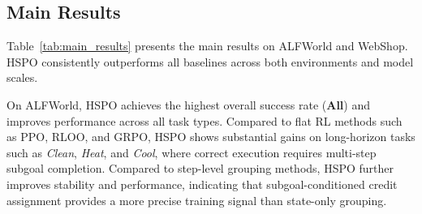 \documentclass{article}
\begin{document}
\begin{table}[t]
\centering
\small
\setlength{\tabcolsep}{4pt}
\renewcommand{\arraystretch}{1.1}
\caption{\textbf{Main results on ALFWorld and WebShop.} 
ALFWorld results are reported by task type and overall average. 
WebShop results are reported with task score and exact success rate.}
\label{tab:main_results_single}
\end{table}

\subsection{Main Results}
\label{sec:main_results}

Table~\ref{tab:main_results} presents the main results on ALFWorld and WebShop. HSPO consistently outperforms all baselines across both environments and model scales.

On ALFWorld, HSPO achieves the highest overall success rate (\textbf{All}) and improves performance across all task types. Compared to flat RL methods such as PPO, RLOO, and GRPO, HSPO shows substantial gains on long-horizon tasks such as \textit{Clean}, \textit{Heat}, and \textit{Cool}, where correct execution requires multi-step subgoal completion. Compared to step-level grouping methods, HSPO further improves stability and performance, indicating that subgoal-conditioned credit assignment provides a more precise training signal than state-only grouping.
\end{document}
